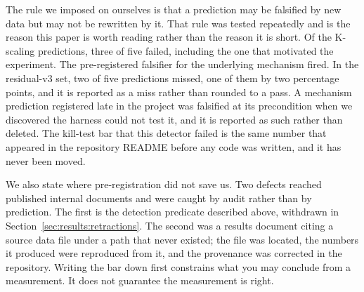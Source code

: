 The rule we imposed on ourselves is that a prediction may be falsified by new
data but may not be rewritten by it. That rule was tested repeatedly and is the
reason this paper is worth reading rather than the reason it is short. Of the
K-scaling predictions, three of five failed, including the one that motivated
the experiment. The pre-registered falsifier for the underlying mechanism
fired. In the residual-v3 set, two of five predictions missed, one of them by
two percentage points, and it is reported as a miss rather than rounded to a
pass. A mechanism prediction registered late in the project was falsified at
its precondition when we discovered the harness could not test it, and it is
reported as such rather than deleted. The kill-test bar that this detector
failed is the same number that appeared in the repository README before any
code was written, and it has never been moved.

We also state where pre-registration did not save us. Two defects reached
published internal documents and were caught by audit rather than by
prediction. The first is the detection predicate described above, withdrawn in
Section~\ref{sec:results:retractions}. The second was a results document citing
a source data file under a path that never existed; the file was located, the
numbers it produced were reproduced from it, and the provenance was corrected
in the repository. Writing the bar down first constrains
what you may conclude from a measurement. It does not guarantee the measurement
is right.
